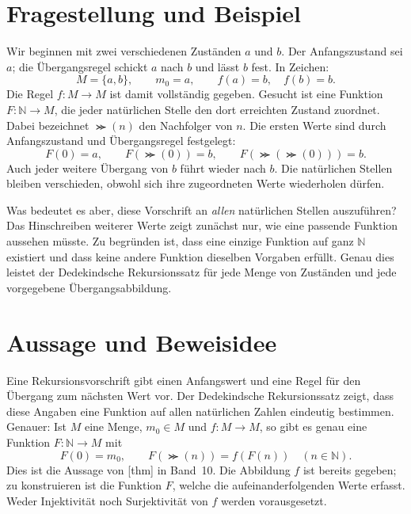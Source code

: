 \section*{Fragestellung und Beispiel}

Wir beginnen mit zwei verschiedenen Zuständen \(a\) und \(b\).
Der Anfangszustand sei \(a\); die Übergangsregel schickt \(a\)
nach \(b\) und lässt \(b\) fest. In Zeichen:
\[
  M=\{a,b\},\qquad m_0=a,\qquad f(a)=b,\quad f(b)=b.
\]
Die Regel \(f\colon M\to M\) ist damit vollständig gegeben.
Gesucht ist eine Funktion \(F\colon\mathbb N\to M\), die jeder
natürlichen Stelle den dort erreichten Zustand zuordnet. Dabei
bezeichnet \(\Succ(n)\) den Nachfolger von \(n\). Die ersten
Werte sind durch Anfangszustand und Übergangsregel festgelegt:
\[
  F(0)=a,\qquad F(\Succ(0))=b,\qquad
  F(\Succ(\Succ(0)))=b.
\]
Auch jeder weitere Übergang von \(b\) führt wieder nach \(b\).
Die natürlichen Stellen bleiben verschieden, obwohl sich ihre
zugeordneten Werte wiederholen dürfen.

\DedekindRecursionDiagram

Was bedeutet es aber, diese Vorschrift an \emph{allen} natürlichen
Stellen auszuführen? Das Hinschreiben weiterer Werte zeigt zunächst
nur, wie eine passende Funktion aussehen müsste. Zu begründen ist,
dass eine einzige Funktion auf ganz \(\mathbb N\) existiert und
dass keine andere Funktion dieselben Vorgaben erfüllt. Genau dies
leistet der Dedekindsche Rekursionssatz für jede Menge von Zuständen
und jede vorgegebene Übergangsabbildung.

\par{}
\section*{Aussage und Beweisidee}

Eine Rekursionsvorschrift gibt einen Anfangswert und eine Regel für den
Übergang zum nächsten Wert vor. Der Dedekindsche Rekursionssatz zeigt,
dass diese Angaben eine Funktion auf allen natürlichen Zahlen eindeutig
bestimmen. Genauer: Ist \(M\) eine Menge, \(m_0\in M\) und
\(f\colon M\to M\), so gibt es genau eine Funktion
\(F\colon\mathbb N\to M\) mit
\[
  F(0)=m_0,
  \qquad
  F(\Succ(n))=f(F(n))
  \quad(n\in\mathbb N).
\]
Dies ist die Aussage von
[thm] in Band~10.
Die Abbildung \(f\) ist bereits gegeben; zu konstruieren ist die
Funktion \(F\), welche die aufeinanderfolgenden Werte erfasst.
Weder Injektivität noch Surjektivität von \(f\) werden vorausgesetzt.

